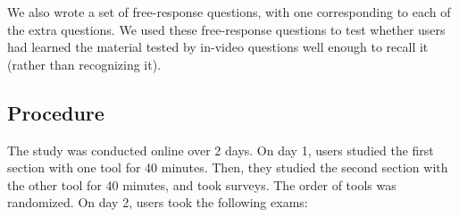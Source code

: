 \documentclass{sigchi}
\begin{document}
We also wrote a set of free-response questions, with one corresponding to each of the extra questions. We used these free-response questions to test whether users had learned the material tested by in-video questions well enough to recall it (rather than recognizing it).


\subsection{Procedure}



The study was conducted online over 2 days. On day 1, users studied the first section with one tool for 40 minutes. Then, they studied the second section with the other tool for 40 minutes, and took surveys. The order of tools was randomized. On day 2, users took the following exams:

\end{document}
